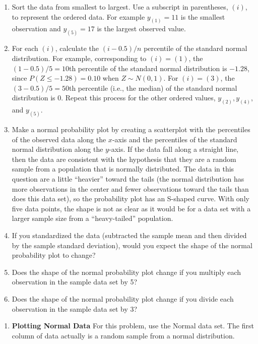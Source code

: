 \documentclass[
]{book}
\providecommand{\tightlist}{%
  \setlength{\itemsep}{0pt}\setlength{\parskip}{0pt}}
\begin{document}
\begin{enumerate}
\def\labelenumi{\alph{enumi}.}
\item
  Sort the data from smallest to largest. Use a subscript in parentheses, \((i)\), to represent the ordered data. For example \(y_{(1)} = 11\) is the smallest observation and \(y_{(5)} = 17\) is the largest observed value.
\item
  For each \((i)\), calculate the \((i - 0.5)/n\) percentile of the standard normal distribution. For example, corresponding to \((i) = (1)\), the \((1 - 0.5)/5 = 10\)th percentile of the standard normal distribution is \(-1.28\), since \(P(Z \leq -1.28) = 0.10\) when \(Z \sim N(0, 1)\). For \((i) = (3)\), the \((3 - 0.5)/5 = 50\)th percentile (i.e., the median) of the standard normal distribution is \(0\). Repeat this process for the other ordered values, \(y_{(2)}, y_{(4)}\), and \(y_{(5)}\).
\item
  Make a normal probability plot by creating a scatterplot with the percentiles of the observed data along the \(x\)-axis and the percentiles of the standard normal distribution along the \(y\)-axis. If the data fall along a straight line, then the data are consistent with the hypothesis that they are a random sample from a population that is normally distributed. The data in this question are a little ``heavier'' toward the tails (the normal distribution has more observations in the center and fewer observations toward the tails than does this data set), so the probability plot has an S-shaped curve. With only five data points, the shape is not as clear as it would be for a data set with a larger sample size from a ``heavy-tailed'' population.
\item
  If you standardized the data (subtracted the sample mean and then divided by the sample standard deviation), would you expect the shape of the normal probability plot to change?
\item
  Does the shape of the normal probability plot change if you multiply each observation in the sample data set by 5?
\item
  Does the shape of the normal probability plot change if you divide each observation in the sample data set by 3?
\end{enumerate}

\begin{enumerate}
\def\labelenumi{\arabic{enumi}.}
\setcounter{enumi}{28}
\tightlist
\item
  \textbf{Plotting Normal Data} For this problem, use the Normal data set. The first column of data actually is a random sample from a normal distribution.
\end{enumerate}
\end{document}
